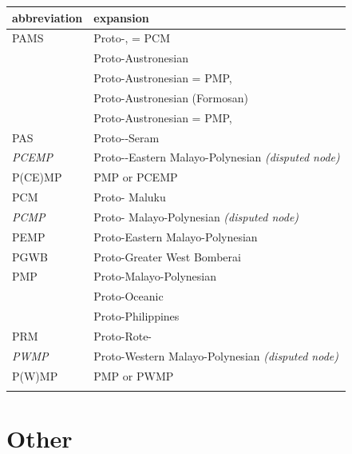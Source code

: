 {\wg
\begin{xltabular}{\textwidth}[l]{l>{\raggedright\arraybackslash}X}
\lsptoprule				
{abbreviation}	&	{expansion}	\\	\midrule \hhline{~}
\endhead
PAMS	&	Proto-, \citet{Stresemann1927} = PCM	\\	
	&	Proto-Austronesian	\\	
	&	Proto-Austronesian = PMP, \citet{Dempwolff1938} \\	
	&	Proto-Austronesian (Formosan)	\\	
	&	Proto-Austronesian = PMP, \citet{Stresemann1927}	\\	
PAS	&	Proto--Seram	\\	
\it{PCEMP}	&	Proto--Eastern Malayo-Polynesian \it{(disputed node)}	\\	
P(CE)MP	&	PMP or PCEMP	\\	
PCM	&	Proto- Maluku	\\	
\it{PCMP}	&	Proto- Malayo-Polynesian \it{(disputed node)}	\\	
PEMP	&	Proto-Eastern Malayo-Polynesian	\\	
PGWB	&	Proto-Greater West Bomberai \citep{UsherSchapper2022}	\\	
PMP	&	Proto-Malayo-Polynesian	\\	
	&	Proto-Oceanic	\\	
	&	Proto-Philippines	\\
PRM	&	Proto-Rote- \citep{Edwards2021}	\\	
\it{PWMP}	&	Proto-Western Malayo-Polynesian \it{(disputed node)}	\\	
P(W)MP	&	PMP or PWMP	\\	\lspbottomrule
\end{xltabular}}

\section*{Other}

